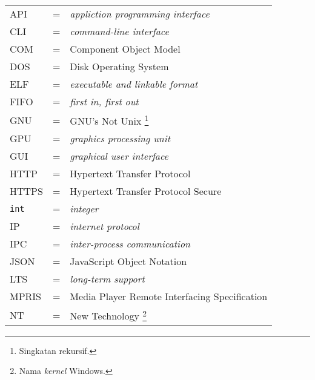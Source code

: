 \begin{longtable}{llp{3in}}
    API & \hspace{1.5cm} = & \textit{appliction programming interface}\\
    CLI & \hspace{1.5cm} = & \textit{command-line interface}\\
    COM & \hspace{1.5cm} = & Component Object Model\\
    DOS & \hspace{1.5cm} = & Disk Operating System\\
    ELF & \hspace{1.5cm} = & \textit{executable and linkable format}\\
    FIFO & \hspace{1.5cm} = & \textit{first in, first out}\\
    GNU & \hspace{1.5cm} = & GNU's Not Unix \footnote{Singkatan rekursif.}\\
    GPU & \hspace{1.5cm} = & \textit{graphics processing unit}\\
    GUI & \hspace{1.5cm} = & \textit{graphical user interface}\\
    HTTP & \hspace{1.5cm} = & Hypertext Transfer Protocol\\
    HTTPS & \hspace{1.5cm} = & Hypertext Transfer Protocol Secure\\
    \verb|int| & \hspace{1.5cm} = & \textit{integer}\\
    IP & \hspace{1.5cm} = & \textit{internet protocol}\\
    IPC & \hspace{1.5cm} = & \textit{inter-process communication}\\
    JSON & \hspace{1.5cm} = & JavaScript Object Notation\\
    LTS & \hspace{1.5cm} = & \textit{long-term support}\\
    MPRIS & \hspace{1.5cm} = & Media Player Remote Interfacing Specification\\
    NT & \hspace{1.5cm} = & New Technology \footnote{Nama \textit{kernel} Windows.}\\

\end{longtable}
